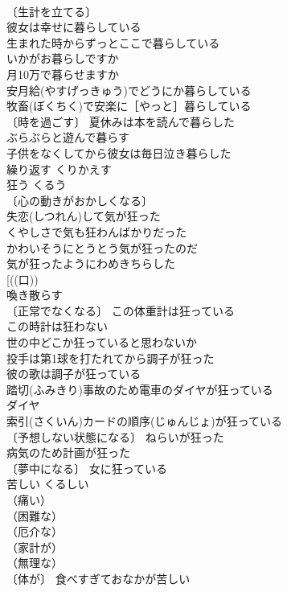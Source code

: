 \documentclass[8pt]{extreport}
\begin{document}
\begin{CJK}{UTF8}{min}
\\	〔生計を立てる〕
\\	彼女は幸せに暮らしている 
\\	生まれた時からずっとここで暮らしている 
\\	いかがお暮らしですか 
\\	月10万で暮らせますか 
\\	安月給(やすげっきゅう)でどうにか暮らしている 
\\	牧畜(ぼくちく)で安楽に［やっと］暮らしている 
\\	〔時を過ごす〕 夏休みは本を読んで暮らした 
\\	ぶらぶらと遊んで暮らす 
\\	子供をなくしてから彼女は毎日泣き暮らした 
\\	繰り返す	くりかえす	
\\	狂う	くるう	
\\	〔心の動きがおかしくなる〕
\\	失恋(しつれん)して気が狂った 
\\	くやしさで気も狂わんばかりだった 
\\	かわいそうにとうとう気が狂ったのだ 
\\	気が狂ったようにわめきちらした 
\\	[((口))
\\	喚き散らす　
\\	〔正常でなくなる〕 この体重計は狂っている 
\\	この時計は狂わない 
\\	世の中どこか狂っていると思わないか 
\\	投手は第1球を打たれてから調子が狂った 
\\	彼の歌は調子が狂っている 
\\	踏切(ふみきり)事故のため電車のダイヤが狂っている 
\\	ダイヤ 
\\	索引(さくいん)カードの順序(じゅんじょ)が狂っている 
\\	〔予想しない状態になる〕 ねらいが狂った 
\\	病気のため計画が狂った 
\\	〔夢中になる〕 女に狂っている 
\\	苦しい	くるしい	
\\	（痛い）
\\	（困難な）
\\	（厄介な）
\\	（家計が）
\\	（無理な）
\\	〔体が〕 食べすぎておなかが苦しい 

\end{CJK}
\end{document}
